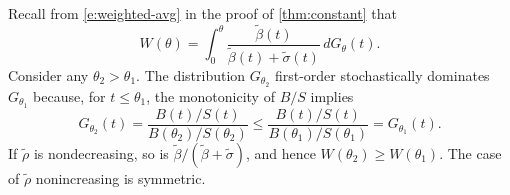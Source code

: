 \documentclass[12 pt]{article}
\makeatletter
\newenvironment{proof}[1][Proof]{\noindent\textbf{#1} }{\ \rule{0.5em}{0.5em}}
\theoremstyle{remark}
\theoremstyle{definition}
\def\typemin{0}
\newcommand{\elaB}{\tilde\beta}   %
\newcommand{\elaS}{\tilde\sigma}  %
\newcommand{\elaR}{\tilde\rho}    %
\renewenvironment{proof}[1][\proofname] {\par\pushQED{\qed}\normalfont\topsep6\p@\@plus6\p@\relax\trivlist\item[\hskip\labelsep\bfseries#1\@addpunct{.}]\ignorespaces}{\popQED\endtrivlist\@endpefalse}
\makeatother
\begin{document}

\begin{proof}
Recall from \autoref{e:weighted-avg} in the proof of \autoref{thm:constant} that
$$W(\theta) = \int_\typemin^\theta \frac{\elaB(t)}{\elaB(t)+\elaS(t)} \, dG_\theta(t).$$
Consider any $\theta_2>\theta_1$. The distribution $G_{\theta_2}$ first-order stochastically dominates $G_{\theta_1}$ because, for $t \leq \theta_1$, the monotonicity of $B/S$ implies
$$G_{\theta_2}(t) = \frac{B(t)/S(t)}{B(\theta_2)/S(\theta_2)} \leq \frac{B(t)/S(t)}{B(\theta_1)/S(\theta_1)} = G_{\theta_1}(t).$$
If $\elaR$ is nondecreasing, so is $\elaB/(\elaB+\elaS)$, and hence $W(\theta_2) \geq W(\theta_1)$. The case of $\elaR$ nonincreasing is symmetric. \qedhere
\end{proof}
\end{document}
